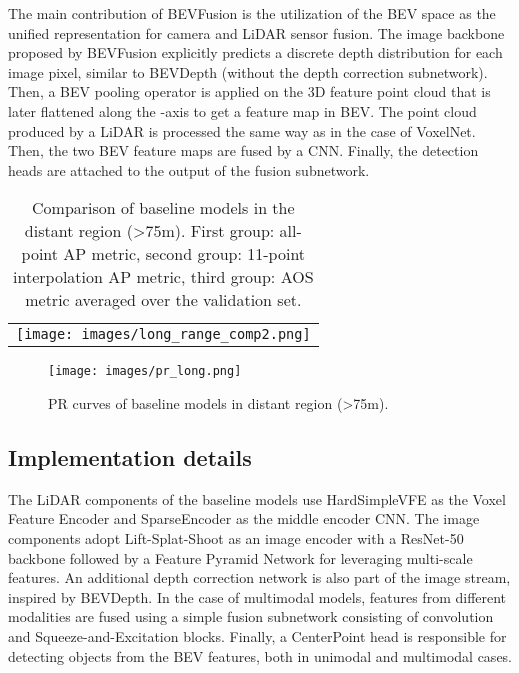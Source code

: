 \documentclass{article}
\begin{document}
The main contribution of BEVFusion is the utilization of the BEV space as the unified representation for camera and LiDAR sensor fusion. The image backbone proposed by BEVFusion explicitly predicts a discrete depth distribution for each image pixel, similar to BEVDepth (without the depth correction subnetwork). Then, a BEV pooling operator is applied on the 3D feature point cloud that is later flattened along the -axis to get a feature map in BEV. The point cloud produced by a LiDAR is processed the same way as in the case of VoxelNet. Then, the two BEV feature maps are fused by a CNN. Finally, the detection heads are attached to the output of the fusion subnetwork.

\begin{table}[t]
  \centering  
  \begin{tabular}{c}       
    \texttt{[image: images/long\_range\_comp2.png]}
  \end{tabular}
  \caption{Comparison of baseline models in the distant region (\textgreater75m). First group: all-point AP metric, second group: 11-point interpolation AP metric, third group: AOS metric averaged over the validation set.}
  \label{tab:metrics-distant}
\end{table}

\begin{figure}[t]
  \centering
   \texttt{[image: images/pr\_long.png]}
   \caption{PR curves of baseline models in distant region (\textgreater75m).}
   \label{fig:pr-curves-distant}
\end{figure}

\subsection{Implementation details}
The LiDAR components of the baseline models use HardSimpleVFE \citep{yan2018second} as the Voxel Feature Encoder and SparseEncoder \citep{yan2018second} as the middle encoder CNN. The image components adopt Lift-Splat-Shoot \citep{philion2020lift} as an image encoder with a ResNet-50 backbone followed by a Feature Pyramid Network \citep{lin2017feature} for leveraging multi-scale features. An additional depth correction network is also part of the image stream, inspired by BEVDepth. In the case of multimodal models, features from different modalities are fused using a simple fusion subnetwork consisting of convolution and Squeeze-and-Excitation \citep{hu2018squeeze} blocks. Finally, a CenterPoint \citep{yin2021center} head is responsible for detecting objects from the BEV features, both in unimodal and multimodal cases.
\end{document}
